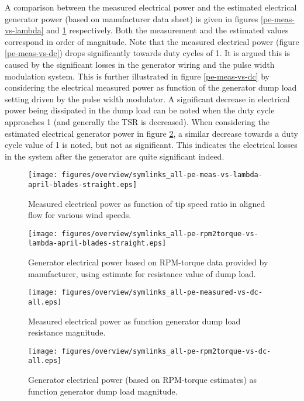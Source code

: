\documentclass[a4paper]{jpconf}
\begin{document}
A comparison between the measured electrical power and the estimated electrical generator power (based on manufacturer data sheet) is given in figures \ref{pe-meas-vs-lambda} and \ref{pe-rpm2torque-vs-lambda} respectively. Both the measurement and the estimated values correspond in order of magnitude. Note that the measured electrical power (figure \ref{pe-meas-vs-dc}) drops significantly towards duty cycles of 1. It is argued this is caused by the significant losses in the generator wiring and the pulse width modulation system. This is further illustrated in figure \ref{pe-meas-vs-dc} by considering the electrical measured power as function of the generator dump load setting driven by the pulse width modulator. A significant decrease in electrical power being dissipated in the dump load can be noted when the duty cycle approaches 1 (and generally the TSR is decreased). When considering the estimated electrical generator power in figure \ref{pe-rpm2torque-vs-dc}, a similar decrease towards a duty cycle value of 1 is noted, but not as significant. This indicates the electrical losses in the system after the generator are quite significant indeed.

\begin{figure}[h]
\begin{minipage}{17pc}
\texttt{[image: figures/overview/symlinks\_all-pe-meas-vs-lambda-april-blades-straight.eps]}
\caption{\label{pe-meas-vs-lambda} Measured electrical power as function of tip speed ratio in aligned flow for various wind speeds.}
\vspace{10px}
\end{minipage}\hspace{3pc}%
\begin{minipage}{17pc}
\texttt{[image: figures/overview/symlinks\_all-pe-rpm2torque-vs-lambda-april-blades-straight.eps]}
\caption{\label{pe-rpm2torque-vs-lambda} Generator electrical power based on RPM-torque data provided by manufacturer, using estimate for resistance value of dump load.}
\end{minipage} 
\end{figure}


\begin{figure}[h]
\begin{minipage}{17pc}
\texttt{[image: figures/overview/symlinks\_all-pe-measured-vs-dc-all.eps]}
\caption{\label{pe-meas-vs-dc} Measured electrical power as function generator dump load resistance magnitude.}
\vspace{10px}
\end{minipage}\hspace{3pc}%
\begin{minipage}{17pc}
\texttt{[image: figures/overview/symlinks\_all-pe-rpm2torque-vs-dc-all.eps]}
\caption{\label{pe-rpm2torque-vs-dc} Generator electrical power (based on RPM-torque estimates) as function generator dump load magnitude.}
\end{minipage} 
\end{figure}
\end{document}

